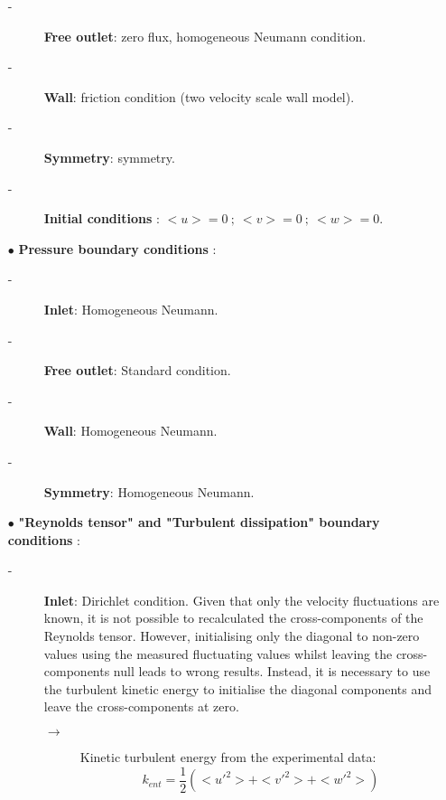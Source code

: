 \documentclass[a4paper,twoside,12pt]{article}
\begin{document}
\begin{itemize}
\begin{description}
\item[-]\textbf{Free outlet}: zero flux, homogeneous Neumann condition.

\item[-]\textbf{Wall}: friction condition (two velocity scale wall model).

\item[-]\textbf{Symmetry}: symmetry.

\item[-]\textbf{Initial conditions} : $<u>=0~;~<v>=0~;~<w>=0$.

\end{description}

\item[$\bullet$] \textbf{Pressure boundary conditions} :
\begin{description}
   \item[-]\textbf{Inlet}: Homogeneous Neumann.
   \item[-]\textbf{Free outlet}: Standard condition.
   \item[-]\textbf{Wall}: Homogeneous Neumann.
   \item[-]\textbf{Symmetry}: Homogeneous Neumann.
\end{description}

\item[$\bullet$] \textbf{"Reynolds tensor" and "Turbulent dissipation" boundary conditions} :

\begin{description}
   \item[-]\textbf{Inlet}: Dirichlet condition. Given that only the velocity fluctuations are known, it is not possible to recalculated the cross-components of the Reynolds tensor. However, initialising only the diagonal to non-zero values using the measured fluctuating values whilst leaving the cross-components null leads to wrong results. Instead, it is necessary to use the turbulent kinetic energy to initialise the diagonal components and leave the cross-components at zero.

         \begin{description}

            \item[$\rightarrow$] Kinetic turbulent energy from the experimental data:
                  \begin{displaymath}
                     k_{ent} = \frac{1}{2} \left( <{u'}^2> + <{v'}^2> + <{w'}^2> \right)
                  \end{displaymath}


\end{description}
\end{description}
\end{itemize}
\end{document}
